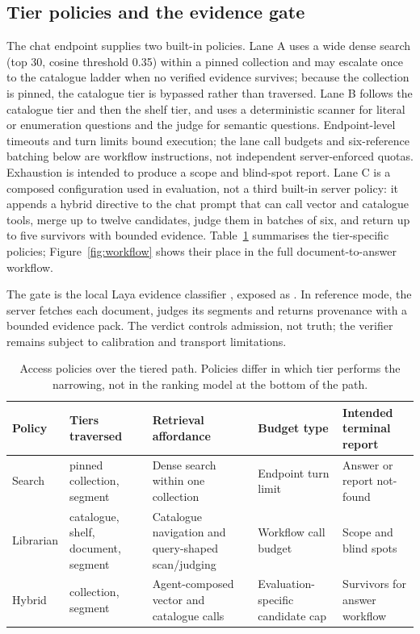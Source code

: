 \subsection{Tier policies and the evidence gate}
\label{sec:trace}
\label{sec:gate}
\label{sec:gate-primitive}
\label{sec:twostage}

The chat endpoint supplies two built-in policies. Lane A uses a wide dense
search (top 30, cosine threshold 0.35) within a pinned collection and may
escalate once to the catalogue ladder when no verified evidence survives;
because the collection is pinned, the catalogue tier is bypassed rather than
traversed. Lane B follows the catalogue tier and then the shelf tier, and
uses a deterministic scanner for literal or enumeration questions and the
judge for semantic questions. Endpoint-level timeouts and turn limits bound
execution; the lane call budgets and six-reference batching below are workflow
instructions, not independent server-enforced quotas. Exhaustion is intended
to produce a scope and blind-spot report. Lane C is a composed configuration
used in evaluation, not a third built-in server policy: it appends a hybrid
directive to the chat prompt that can call vector and catalogue tools, merge up
to twelve candidates, judge them in batches of six, and return up to five
survivors with bounded evidence. Table~\ref{tab:lanes} summarises the
tier-specific policies; Figure~\ref{fig:workflow} shows their place in the
full document-to-answer workflow.

The gate is the local Laya evidence classifier \cite{laya}, exposed as
. In reference mode, the server fetches each document,
judges its segments and returns provenance with a bounded evidence pack. The
verdict controls admission, not truth; the verifier remains subject to
calibration and transport limitations.

\begin{table}[t]
\centering
\small
\setlength{\tabcolsep}{5pt}
\caption{Access policies over the tiered path. Policies differ in which tier
performs the narrowing, not in the ranking model at the bottom of the path.}
\label{tab:lanes}
\begin{tabular}{@{}>{\raggedright\arraybackslash}p{}>{\raggedright\arraybackslash}p{}>{\raggedright\arraybackslash}p{}>{\raggedright\arraybackslash}p{}>{\raggedright\arraybackslash}p{}@{}}
\toprule
Policy & Tiers traversed & Retrieval affordance & Budget type & Intended terminal report\\
\midrule
Search & pinned collection, segment & Dense search within one collection & Endpoint turn limit & Answer or report not-found\\
Librarian & catalogue, shelf, document, segment & Catalogue navigation and query-shaped scan/judging & Workflow call budget & Scope and blind spots\\
Hybrid & collection, segment & Agent-composed vector and catalogue calls & Evaluation-specific candidate cap & Survivors for answer workflow\\
\bottomrule
\end{tabular}
\end{table}

